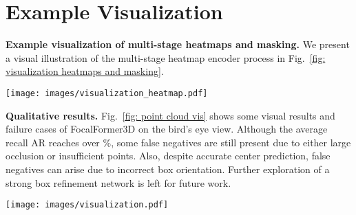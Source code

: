 \documentclass[10pt,twocolumn,letterpaper]{article}
\begin{document}
\section{Example Visualization}
\label{sec: visualization}

\vspace{2mm}
\noindent\textbf{Example visualization of multi-stage heatmaps and masking.}
We present a visual illustration of the multi-stage heatmap encoder process in Fig.~\ref{fig: visualization heatmaps and masking}. 


\begin{figure*}[t]
	\begin{center}
		\texttt{[image: images/visualization\_heatmap.pdf]}
	\end{center}
	\caption{\textbf{Example visualization of multi-stage heatmap encoder process on the bird's eye view}. The process of identifying false negatives operates stage by stage. We show different categories with different colors for visualization. The top three subfigures display the ground-truth center heatmaps at each stage, highlighting the missed object detections. The two subfigures below display the positive mask that shows positive object predictions. The scene ids are ''4de831d46edf46d084ac2cecf682b11a'' and ''825a9083e9fc466ca6fdb4bb75a95449'' from the nuScenes \textit{val} set. We recommend zooming in on the figure for best viewing.}
	\label{fig: visualization heatmaps and masking}
\end{figure*}

\vspace{2mm}
\noindent\textbf{Qualitative results.}
Fig.~\ref{fig: point cloud vis} shows some visual results and failure cases of FocalFormer3D on the bird's eye view. Although the average recall AR reaches over \%, some false negatives are still present due to either large occlusion or insufficient points. Also, despite accurate center prediction, false negatives can arise due to incorrect box orientation. Further exploration of a strong box refinement network is left for future work.

\begin{figure*}[t]
	\begin{center}
		\texttt{[image: images/visualization.pdf]}
	\end{center}
	\caption{\textbf{Visual results and failure cases.} The green boxes represent the ground truth objects and the blue ones stand for our predictions. We recommend zooming in on the figure for best viewing.}
	\label{fig: point cloud vis}
\end{figure*}
\end{document}
